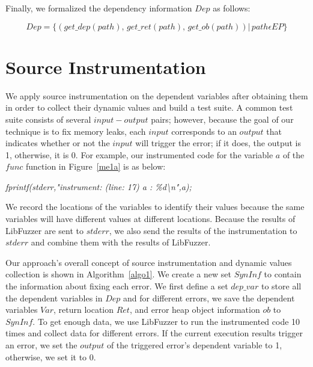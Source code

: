 \documentclass[a4paper,11pt,oneside,openany]{book}
\begin{document}
Finally, we formalized the dependency information $Dep$ as follows:

\begin{equation}
Dep=\{(get\_dep(path),\,get\_ret(path),\,get\_ob(path))|\, path \epsilon EP\}
\end{equation}

\section{Source Instrumentation}
We apply source instrumentation on the dependent variables after obtaining them in order to collect their dynamic values and build a test suite. A common test suite consists of several $input-output$ pairs; however, because the goal of our technique is to fix memory leaks, each $input$ corresponds to an $output$ that indicates whether or not the $input$ will trigger the error; if it does, the output is 1, otherwise, it is 0. For example, our instrumented code for the variable $a$ of the $func$ function in Figure~\ref{me1a} is as below:


\begin{minipage}{\textwidth}
\vspace{0.2cm}
\textsl{\hspace{0.3cm}fprintf(stderr,"instrument: (line: 17) a : \%d\textbackslash n",a);}
\vspace{0.2cm}
\end{minipage}
We record the locations of the variables to identify their values because the same variables will have different values at different locations. Because the results of LibFuzzer are sent to $stderr$, we also send the results of the instrumentation to $stderr$ and combine them with the results of LibFuzzer.


Our approach's overall concept of source instrumentation and dynamic values collection is shown in Algorithm~\ref{algo1}. We create a new set $SynInf$ to contain the information about fixing each error. We first define a set $dep\_var$ to store all the dependent variables in $Dep$ and for different errors, we save the dependent variables $Var$, return location $Ret$, and error heap object information $ob$ to $SynInf$. To get enough data, we use LibFuzzer to run the instrumented code 10 times and collect data for different errors. If the current execution results trigger an error, we set the $output$ of the triggered error's dependent variable to 1, otherwise, we set it to 0.
\end{document}
